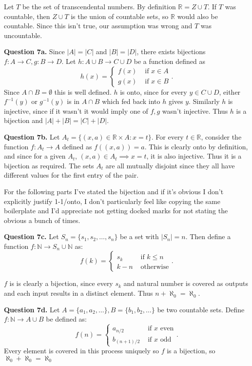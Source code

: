 \documentclass[letterpaper, reqno,11pt]{article}
\begin{document}
Let $T$ be the set of transcendental numbers. By definition $\mathbb{R}=Z\cup T$. If $T$ was countable, then $Z\cup T$ is the union of countable sets, so $\mathbb{R}$ would also be countable. Since this isn't true, our assumption was wrong and $T$ was uncountable.

\newpage

{\medskip\noindent\bf Question 7a.} Since $|A|=|C|$ and $|B|=|D|$, there exists bijections $f:A\to C,g:B\to D$. Let $h:A\cup B\to C\cup D$ be a function defined as
\[
h(x)=\begin{cases}
    f(x)&\text{ if }x\in A\\
    g(x)&\text{ if } x\in B
\end{cases}
.\]
Since $A\cap B=\emptyset$ this is well defined. $h$ is onto, since for every $y\in C\cup D$, either $f^{-1}(y)$ or $g^{-1}(y)$ is in $A\cap B$ which fed back into $h$ gives $y$. Similarly $h$ is injective, since if it wasn't it would imply one of $f,g$ wasn't injective. Thus $h$ is a bijection and $|A|+|B|=|C|+|D|$.

{\medskip\noindent\bf Question 7b.} Let $A_t=\{(x, a)\in \mathbb{R}\times A: x=t\}$. For every $t\in \mathbb{R}$, consider the function $f:A_t\to A$ defined as $f((x, a))=a$. This is clearly onto by definition, and since for a given $A_t$, $(x,a)\in A_t\implies x=t$, it is also injective. Thus it is a bijection as required. The sets $A_t$ are all mutually disjoint since they all have different values for the first entry of the pair.

\medskip

For the following parts I've stated the bijection and if it's obvious I don't explicitly justify 1-1/onto, I don't particularly feel like copying the same boilerplate and I'd appreciate not getting docked marks for not stating the obvious a bunch of times.

{\medskip\noindent\bf Question 7c.} Let $S_n=\{s_1, s_2, \ldots, s_n\}$ be a set with $|S_n|=n$. Then define a function $f:\mathbb{N}\to S_n\cup \mathbb{N}$ as:
\[
f(k)=\begin{cases}
    s_k&\text{ if } k\leq n\\
    k-n&\text{ otherwise}
\end{cases}
.\]

$f$ is is clearly a bijection, since every $s_k$ and natural number is covered as outputs and each input results in a distinct element. Thus $n+\aleph_0=\aleph_0$.

{\medskip\noindent\bf Question 7d.} Let $A=\{a_1, a_2, \ldots\}, B=\{b_1, b_2, \ldots\}$ be two countable sets. Define $f:\mathbb{N}\to A\cup B$ be defined as:
\[
f(n)=\begin{cases}
    a_{n /2}&\text{ if } x\text{ even}\\
    b_{(n+1) /2}&\text{ if }x\text{ odd}
\end{cases}
.\]
Every element is covered in this process uniquely so $f$ is a bijection, so $\aleph_0+\aleph_0=\aleph_0$
\end{document}
